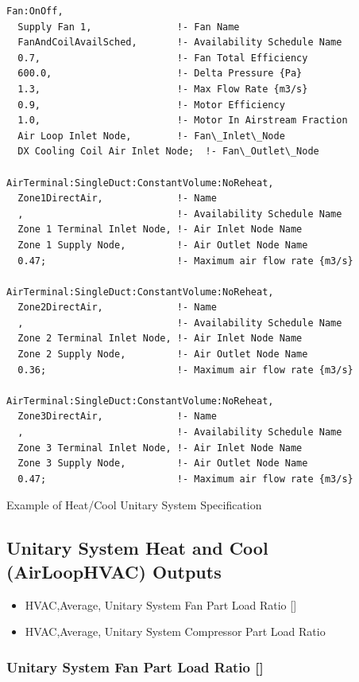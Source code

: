 \begin{lstlisting}
Fan:OnOff,
  Supply Fan 1,               !- Fan Name
  FanAndCoilAvailSched,       !- Availability Schedule Name
  0.7,                        !- Fan Total Efficiency
  600.0,                      !- Delta Pressure {Pa}
  1.3,                        !- Max Flow Rate {m3/s}
  0.9,                        !- Motor Efficiency
  1.0,                        !- Motor In Airstream Fraction
  Air Loop Inlet Node,        !- Fan\_Inlet\_Node
  DX Cooling Coil Air Inlet Node;  !- Fan\_Outlet\_Node

AirTerminal:SingleDuct:ConstantVolume:NoReheat,
  Zone1DirectAir,             !- Name
  ,                           !- Availability Schedule Name
  Zone 1 Terminal Inlet Node, !- Air Inlet Node Name
  Zone 1 Supply Node,         !- Air Outlet Node Name
  0.47;                       !- Maximum air flow rate {m3/s}

AirTerminal:SingleDuct:ConstantVolume:NoReheat,
  Zone2DirectAir,             !- Name
  ,                           !- Availability Schedule Name
  Zone 2 Terminal Inlet Node, !- Air Inlet Node Name
  Zone 2 Supply Node,         !- Air Outlet Node Name
  0.36;                       !- Maximum air flow rate {m3/s}

AirTerminal:SingleDuct:ConstantVolume:NoReheat,
  Zone3DirectAir,             !- Name
  ,                           !- Availability Schedule Name
  Zone 3 Terminal Inlet Node, !- Air Inlet Node Name
  Zone 3 Supply Node,         !- Air Outlet Node Name
  0.47;                       !- Maximum air flow rate {m3/s}
\end{lstlisting}

Example of Heat/Cool Unitary System Specification

\subsection{Unitary System Heat and Cool (AirLoopHVAC) Outputs}\label{unitary-system-heat-and-cool-airloophvac-outputs}

\begin{itemize}
\item
  HVAC,Average, Unitary System Fan Part Load Ratio {[]}
\item
  HVAC,Average, Unitary System Compressor Part Load Ratio
\end{itemize}

\subsubsection{Unitary System Fan Part Load Ratio {[]}}\label{unitary-system-fan-part-load-ratio-2}

